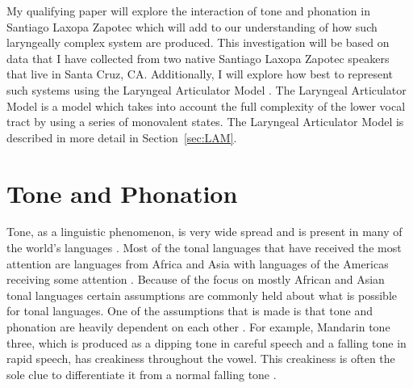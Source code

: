 \documentclass[12pt, letterpaper]{article}
\begin{document}
My qualifying paper will explore the interaction of tone and phonation in Santiago Laxopa Zapotec which will add to our understanding of how such laryngeally complex system are produced. This investigation will be based on data that I have collected from two native Santiago Laxopa Zapotec speakers that live in Santa Cruz, CA. Additionally, I will explore how best to represent such systems using the Laryngeal Articulator Model \citep{eslingVoiceQualityLaryngeal2019}. The Laryngeal Articulator Model is a model which takes into account the full complexity of the lower vocal tract by using a series of monovalent states. The Laryngeal Articulator Model is described in more detail in Section~\ref{sec:LAM}.  

\section{Tone and Phonation} \label{sec:TonePhonation}

Tone, as a linguistic phenomenon, is very wide spread and is present in many of the world's languages \citep{yipTone2002}. Most of the tonal languages that have received the most attention are languages from Africa and Asia with languages of the Americas receiving some attention \citep{pikeToneLanguagesTechnique1948,silvermanLaryngealComplexityOtomanguean1997,campbellOtomangueanHistoricalLinguistics2017a,campbellOtomangueanHistoricalLinguistics2017}. Because of the focus on mostly African and Asian tonal languages certain assumptions are commonly held about what is possible for tonal languages. One of the assumptions that is made is that tone and phonation are heavily dependent on each other \citep{andruskiPhonationTypesProduction2000,yipTone2002,garellekVoiceQualityTone2013,brunelleTonePhonationSoutheast2016,weePhonologicalTone2019,hymanToneSystems2020,garellekPhoneticsWhiteHmong2021}. For example, Mandarin tone three, which is produced as a dipping tone in careful speech and a falling tone in rapid speech, has creakiness throughout the vowel. This creakiness is often the sole clue to differentiate it from a normal falling tone \citep{duanmuPhonologyStandardChinese2007,kuangCovariationVoiceQuality2017}. 
\end{document}
